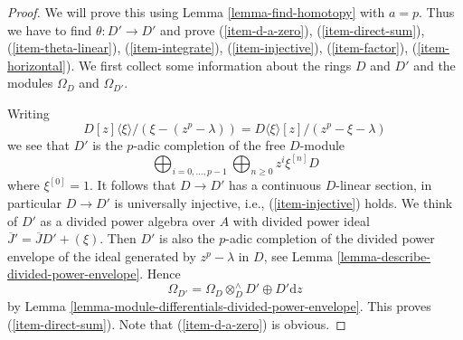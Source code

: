 \begin{proof}
We will prove this using Lemma \ref{lemma-find-homotopy} with $a = p$.
Thus we have to find $\theta : D' \to D'$ and prove
(\ref{item-d-a-zero}), (\ref{item-direct-sum}), (\ref{item-theta-linear}),
(\ref{item-integrate}), (\ref{item-injective}), (\ref{item-factor}),
(\ref{item-horizontal}). We first collect some information about the rings
$D$ and $D'$ and the modules $\Omega_D$ and $\Omega_{D'}$.

\medskip\noindent
Writing
$$
D[z]\langle \xi \rangle/(\xi - (z^p - \lambda))
=
D\langle \xi \rangle[z]/(z^p - \xi - \lambda)
$$
we see that $D'$ is the $p$-adic completion of the free $D$-module
$$
\bigoplus\nolimits_{i = 0, \ldots, p - 1}
\bigoplus\nolimits_{n \geq 0}
z^i \xi^{[n]} D
$$
where $\xi^{[0]} = 1$.
It follows that $D \to D'$ has a continuous $D$-linear section, in particular
$D \to D'$ is universally injective, i.e., (\ref{item-injective}) holds.
We think of $D'$ as a divided power algebra
over $A$ with divided power ideal $\overline{J}' = \overline{J}D' + (\xi)$.
Then $D'$ is also the $p$-adic completion of the divided power envelope
of the ideal generated by $z^p - \lambda$ in $D$, see
Lemma \ref{lemma-describe-divided-power-envelope}. Hence
$$
\Omega_{D'} = \Omega_D \otimes_D^\wedge D' \oplus D'\text{d}z
$$
by Lemma \ref{lemma-module-differentials-divided-power-envelope}.
This proves (\ref{item-direct-sum}). Note that (\ref{item-d-a-zero})
is obvious.


\end{proof}
